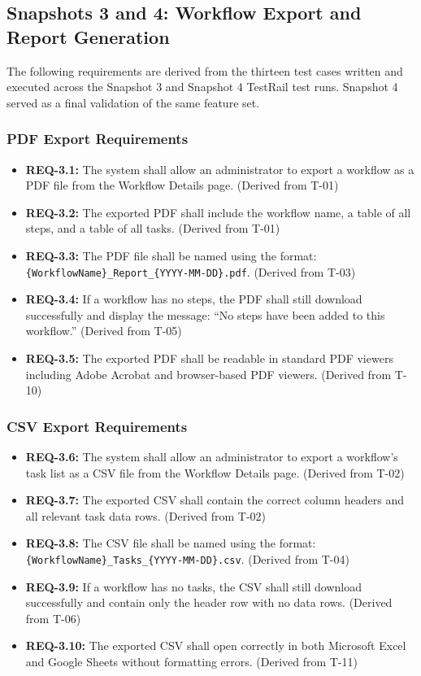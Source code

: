 \documentclass[12pt]{article}
\begin{document}
\subsection{Snapshots 3 and 4: Workflow Export and Report Generation}
The following requirements are derived from the thirteen test cases written and executed
across the Snapshot 3 and Snapshot 4 TestRail test runs. Snapshot 4 served as a final
validation of the same feature set.
 
\subsubsection{PDF Export Requirements}
\begin{itemize}
    \item \textbf{REQ-3.1:} The system shall allow an administrator to export a workflow
    as a PDF file from the Workflow Details page. (Derived from T-01)
    \item \textbf{REQ-3.2:} The exported PDF shall include the workflow name, a table of
    all steps, and a table of all tasks. (Derived from T-01)
    \item \textbf{REQ-3.3:} The PDF file shall be named using the format:
    \texttt{\{WorkflowName\}\_Report\_\{YYYY-MM-DD\}.pdf}. (Derived from T-03)
    \item \textbf{REQ-3.4:} If a workflow has no steps, the PDF shall still download
    successfully and display the message: ``No steps have been added to this workflow.''
    (Derived from T-05)
    \item \textbf{REQ-3.5:} The exported PDF shall be readable in standard PDF viewers
    including Adobe Acrobat and browser-based PDF viewers. (Derived from T-10)
\end{itemize}
 
\subsubsection{CSV Export Requirements}
\begin{itemize}
    \item \textbf{REQ-3.6:} The system shall allow an administrator to export a workflow's
    task list as a CSV file from the Workflow Details page. (Derived from T-02)
    \item \textbf{REQ-3.7:} The exported CSV shall contain the correct column headers and
    all relevant task data rows. (Derived from T-02)
    \item \textbf{REQ-3.8:} The CSV file shall be named using the format:
    \texttt{\{WorkflowName\}\_Tasks\_\{YYYY-MM-DD\}.csv}. (Derived from T-04)
    \item \textbf{REQ-3.9:} If a workflow has no tasks, the CSV shall still download
    successfully and contain only the header row with no data rows. (Derived from T-06)
    \item \textbf{REQ-3.10:} The exported CSV shall open correctly in both Microsoft Excel
    and Google Sheets without formatting errors. (Derived from T-11)
\end{itemize}
 
\end{document}
